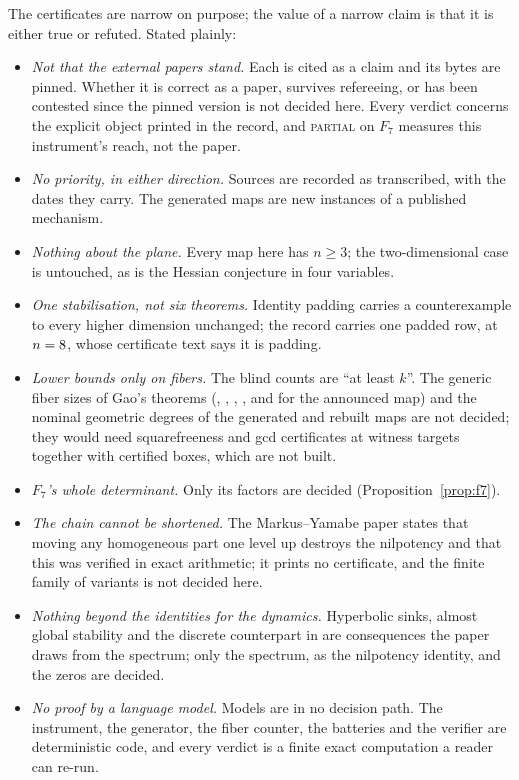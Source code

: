 \documentclass[11pt]{article}
\newcommand{\verdict}[1]{\textsc{#1}}
\begin{document}
The certificates are narrow on purpose; the value of a narrow claim is that it is either true or
refuted. Stated plainly:
\begin{itemize}
\item \emph{Not that the external papers stand.} Each is cited as a claim and its bytes are
pinned. Whether it is correct as a paper, survives refereeing, or has been contested since the
pinned version is not decided here. Every verdict concerns the explicit object printed in the
record, and \verdict{partial} on $F_7$ measures this instrument's reach, not the paper.
\item \emph{No priority, in either direction.} Sources are recorded as transcribed, with the
dates they carry. The generated maps are new instances of a published mechanism.
\item \emph{Nothing about the plane.} Every map here has $n\ge3$; the two-dimensional case is
untouched, as is the Hessian conjecture in four variables.
\item \emph{One stabilisation, not six theorems.} Identity padding carries a counterexample to
every higher dimension unchanged; the record carries one padded row, at $n=8$, whose
certificate text says it is padding.
\item \emph{Lower bounds only on fibers.} The blind counts are ``at least $k$''. The generic
fiber sizes of Gao's theorems (\FiberG, \FiberFfour, \FiberFfive, \FiberFsix, \FiberFseven{} and
\FiberAlpoge{} for the announced map) and the nominal geometric degrees of the generated and
rebuilt maps are not decided; they would need squarefreeness and gcd certificates at witness
targets together with certified boxes, which are not built.
\item \emph{$F_7$'s whole determinant.} Only its factors are decided (Proposition~\ref{prop:f7}).
\item \emph{The chain cannot be shortened.} The Markus--Yamabe paper states that moving any
homogeneous part one level up destroys the nilpotency and that this was verified in exact
arithmetic; it prints no certificate, and the finite family of variants is not decided here.
\item \emph{Nothing beyond the identities for the dynamics.} Hyperbolic sinks, almost global
stability and the discrete counterpart in \cite{CHV2026} are consequences the paper draws from the
spectrum; only the spectrum, as the nilpotency identity, and the zeros are decided.
\item \emph{No proof by a language model.} Models are in no decision path. The instrument, the
generator, the fiber counter, the batteries and the verifier are deterministic code, and every
verdict is a finite exact computation a reader can re-run.
\end{itemize}
\end{document}
